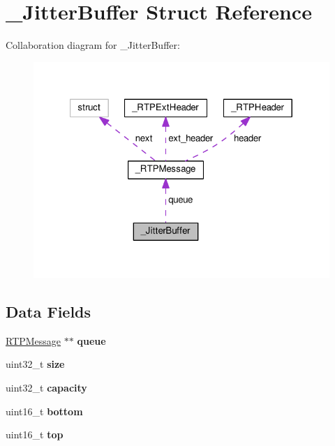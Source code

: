 \hypertarget{struct___jitter_buffer}{\section{\+\_\+\+Jitter\+Buffer Struct Reference}
\label{struct___jitter_buffer}
}


Collaboration diagram for \+\_\+\+Jitter\+Buffer\+:\nopagebreak
\begin{figure}[H]
\begin{center}
\leavevmode
\includegraphics[width=321pt]{struct___jitter_buffer__coll__graph}
\end{center}
\end{figure}
\subsection*{Data Fields}
\begin{DoxyCompactItemize}
\item 
\hypertarget{struct___jitter_buffer_aba0e7057fa735d7bfaa585fd7bf43a24}{\hyperlink{struct___r_t_p_message}{R\+T\+P\+Message} $\ast$$\ast$ {\bfseries queue}}\label{struct___jitter_buffer_aba0e7057fa735d7bfaa585fd7bf43a24}

\item 
\hypertarget{struct___jitter_buffer_ab2c6b258f02add8fdf4cfc7c371dd772}{uint32\+\_\+t {\bfseries size}}\label{struct___jitter_buffer_ab2c6b258f02add8fdf4cfc7c371dd772}

\item 
\hypertarget{struct___jitter_buffer_a391c992c66c3e5540265a85ec2b9216a}{uint32\+\_\+t {\bfseries capacity}}\label{struct___jitter_buffer_a391c992c66c3e5540265a85ec2b9216a}

\item 
\hypertarget{struct___jitter_buffer_a12c8099ac87952580dd090215e02728c}{uint16\+\_\+t {\bfseries bottom}}\label{struct___jitter_buffer_a12c8099ac87952580dd090215e02728c}

\item 
\hypertarget{struct___jitter_buffer_a0c235a6df98714bb18538fc0afc5bad1}{uint16\+\_\+t {\bfseries top}}\label{struct___jitter_buffer_a0c235a6df98714bb18538fc0afc5bad1}

\end{DoxyCompactItemize}


